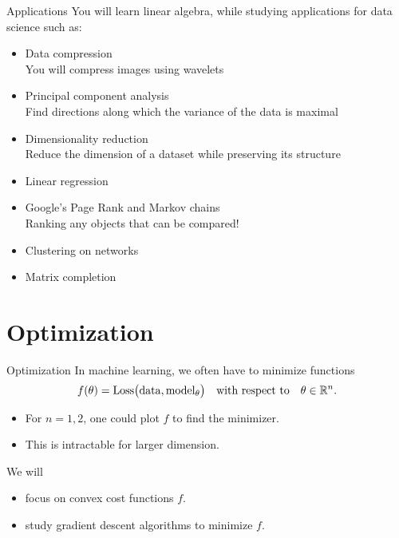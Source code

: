 \documentclass{beamer}
\newcommand{\below}[1]{\\ \textcolor{ExecusharesGrey}{\footnotesize\hspace{1em} #1}}
\begin{document}
\begin{frame}{Applications}
	You will learn linear algebra, while studying applications for data science such as:
	\vspace{0.5cm}
	\begin{itemize}
		\item Data compression \below{You will compress images using wavelets}
		\item Principal component analysis \below{Find directions along which the variance of the data is maximal}
		\item Dimensionality reduction \below{Reduce the dimension of a dataset while preserving its structure}
		\item Linear regression 
		\item Google's Page Rank and Markov chains \below{Ranking any objects that can be compared!}
		\item Clustering on networks
		\item Matrix completion
	\end{itemize}
\end{frame}


\section{Optimization}
\begin{frame}[t]{Optimization}
	In machine learning, we often have to minimize functions
	$$
	f(\theta) = {\rm Loss}\big( {\rm data}, {\rm model}_{\theta}\big)
	\quad \text{with respect to} \quad \theta \in \mathbb{R}^n.
	$$
	\begin{itemize}
		\item For $n=1,2$, one could plot $f$ to find the minimizer.
		\item This is intractable for larger dimension.
	\end{itemize}

	\vspace{0.2cm}
	\begin{block}{We will}
		\begin{itemize}
			\item focus on convex cost functions $f$.
			\item study gradient descent algorithms to minimize $f$.
		\end{itemize}
	\end{block}
\end{frame}
\end{document}
